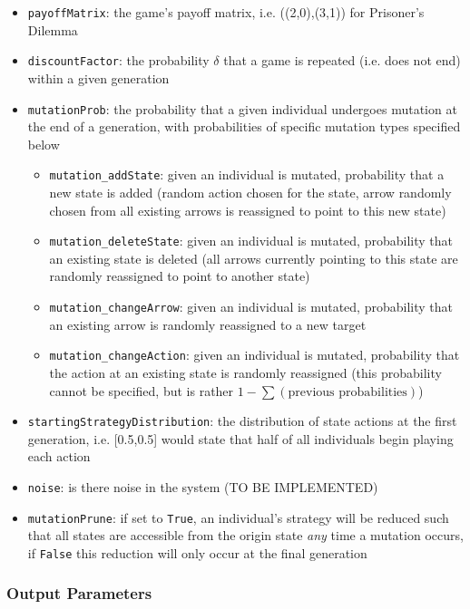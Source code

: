 \documentclass[11pt,twoside]{report}
\begin{document}
\begin{itemize}
\item \texttt{payoffMatrix}: the game's payoff matrix, i.e. ((2,0),(3,1)) for Prisoner's Dilemma  
\item \texttt{discountFactor}: the probability $\delta$ that a game is repeated (i.e. does not end) within a given generation
\item \texttt{mutationProb}: the probability that a given individual undergoes mutation at the end of a generation, with probabilities of specific mutation types specified below
\begin{itemize}
\item \texttt{mutation\_addState}: given an individual is mutated, probability that a new state is added (random action chosen for the state, arrow randomly chosen from all existing arrows is reassigned to point to this new state)
\item \texttt{mutation\_deleteState}: given an individual is mutated, probability that an existing state is deleted (all arrows currently pointing to this state are randomly reassigned to point to another state)
\item \texttt{mutation\_changeArrow}: given an individual is mutated, probability that an existing arrow is randomly reassigned to a new target
\item \texttt{mutation\_changeAction}: given an individual is mutated, probability that the action at an existing state is randomly reassigned (this probability cannot be specified, but is rather $1 - \sum (\text{previous probabilities})$)
\end{itemize}
\item \texttt{startingStrategyDistribution}: the distribution of state actions at the first generation, i.e. [0.5,0.5] would state that half of all individuals begin playing each action
\item \texttt{noise}: is there noise in the system (TO BE IMPLEMENTED)
\item \texttt{mutationPrune}: if set to \texttt{True}, an individual's strategy will be reduced such that all states are accessible from the origin state \textit{any} time a mutation occurs, if \texttt{False} this reduction will only occur at the final generation 
\end{itemize}

\subsubsection*{Output Parameters}
\end{document}
